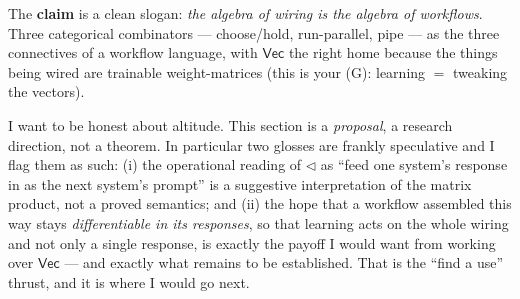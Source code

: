 \documentclass[11pt]{article}
\providecommand{\Vec}{}\renewcommand{\Vec}{\mathsf{Vec}}
\begin{document}
The \textbf{claim} is a clean slogan: \emph{the algebra of wiring is the algebra of
workflows}. Three categorical combinators --- choose/hold, run-parallel, pipe --- as
the three connectives of a workflow language, with $\Vec$ the right home because the
things being wired are trainable weight-matrices (this is your (G): learning $=$
tweaking the vectors).

I want to be honest about altitude. This section is a \emph{proposal}, a research
direction, not a theorem. In particular two glosses are frankly speculative and I flag
them as such: (i) the operational reading of $\lhd$ as ``feed one system's response in
as the next system's prompt'' is a suggestive interpretation of the matrix product, not
a proved semantics; and (ii) the hope that a workflow assembled this way stays
\emph{differentiable in its responses}, so that learning acts on the whole wiring and
not only a single response, is exactly the payoff I would want from working over $\Vec$
--- and exactly what remains to be established. That is the ``find a use'' thrust, and
it is where I would go next.
\end{document}

